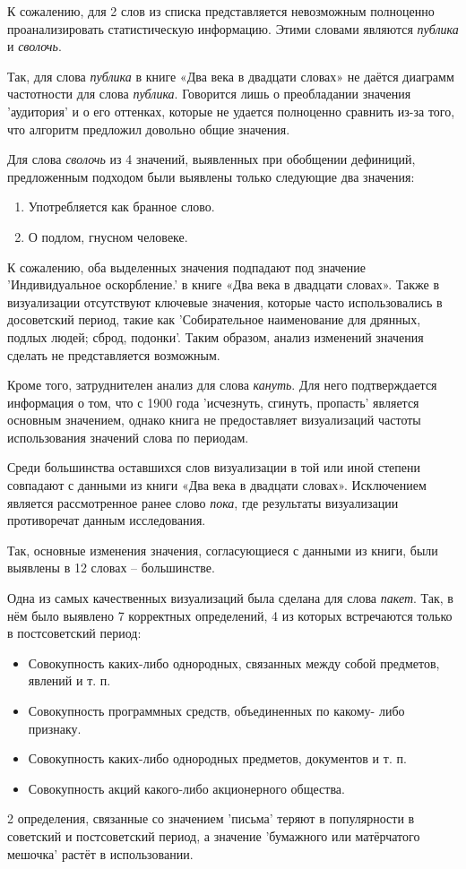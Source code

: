 \documentclass[LI,VKR]{HSEUniversity}
\begin{document}
К сожалению, для 2 слов из списка представляется невозможным полноценно проанализировать
статистическую информацию.
Этими словами являются \textit{публика} и \textit{сволочь}.

Так, для слова \textit{публика} в книге «Два века в двадцати словах» не даётся
диаграмм частотности для слова \textit{публика}.
Говорится лишь о преобладании значения ’аудитория’ и о его оттенках,
которые не удается полноценно сравнить из-за того, что алгоритм предложил довольно общие значения.

Для слова \textit{сволочь} из 4 значений, выявленных при обобщении дефиниций,
предложенным подходом были выявлены только следующие два значения:
\begin{enumerate}
    \item Употребляется как бранное слово.
    \item О подлом, гнусном человеке.
\end{enumerate}

К сожалению, оба выделенных значения подпадают под значение ’Индивидуальное оскорбление.’
в книге «Два века в двадцати словах».
Также в визуализации отсутствуют ключевые значения,
которые часто использовались в досоветский период, такие как ’Собирательное наименование для дрянных, подлых людей; сброд, подонки’.
Таким образом, анализ изменений значения сделать не представляется возможным.

Кроме того, затруднителен анализ для слова \textit{кануть}.
Для него подтверждается информация о том, что с 1900 года ’исчезнуть, сгинуть, пропасть’ является
основным значением, однако книга не предоставляет визуализаций частоты
использования значений слова по периодам.

Среди большинства оставшихся слов визуализации в той или иной степени совпадают с данными из книги «Два века в двадцати словах».
Исключением является рассмотренное ранее слово \textit{пока}, где результаты визуализации противоречат
данным исследования.

Так, основные изменения значения, согласующиеся с данными из книги, были
выявлены в 12 словах – большинстве.

Одна из самых качественных визуализаций была сделана для слова \textit{пакет}.
Так, в нём было выявлено 7 корректных определений,
4 из которых встречаются только в постсоветский период:
\begin{itemize}
    \item Совокупность каких-либо однородных, связанных между собой
предметов, явлений и т. п.
    \item Совокупность программных средств, объединенных по какому-
либо признаку.
    \item Совокупность каких-либо однородных предметов, документов и т.
п.
    \item Совокупность акций какого-либо акционерного общества.
\end{itemize}
2 определения, связанные со значением ’письма’ теряют в популярности в советский и постсоветский период,
а значение ’бумажного или матёрчатого мешочка’ растёт в использовании.
\end{document}
